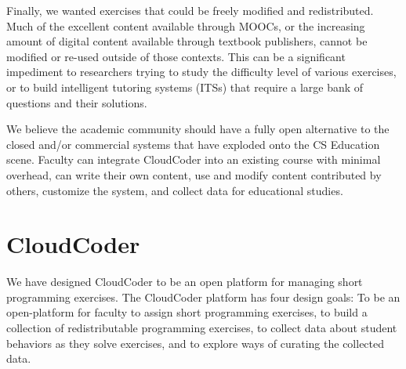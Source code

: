 \documentclass{sig-alternate}
\begin{document}
Finally, we wanted exercises that could be freely modified and
redistributed.  Much of the excellent content available through MOOCs,
or the increasing amount of digital content available through textbook publishers, 
cannot be modified or re-used outside of those contexts.  This can be a significant
impediment to researchers trying to study the difficulty level of
various exercises, or to build intelligent tutoring systems (ITSs)
that require a large bank of questions and their solutions.



We believe the academic community should have a fully open alternative
to the closed and/or commercial systems that have exploded onto the CS
Education scene.  Faculty can integrate CloudCoder into an existing course with minimal overhead,
can write their own content, use and modify content contributed by
others, customize the system, and collect data for educational studies.

\section{CloudCoder}
We have designed CloudCoder to be an open platform for managing short
programming exercises.  The CloudCoder platform has four design
goals:  To be an open-platform for faculty to assign short programming
exercises, to build a collection of redistributable programming
exercises, to collect data about student behaviors as they solve
exercises, and to explore ways of curating the collected data.
\end{document}
